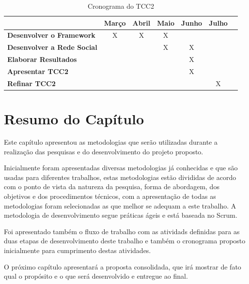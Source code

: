 \begin{table}[h]
\centering
\caption{Cronograma do TCC2}
\label{cronograma tcc2}
\begin{tabular}{|l|c|c|c|c|c|c|}
\hline
                                      			& \multicolumn{1}{l|}{\textbf{Março}} & \multicolumn{1}{l|}{\textbf{Abril}} & \multicolumn{1}{l|}{\textbf{Maio}} & \multicolumn{1}{l|}{\textbf{Junho}} & \multicolumn{1}{l|}{\textbf{Julho}} \\ \hline
\textbf{Desenvolver o Framework}                & X                           		  & X                              		& X                            		 &                               	   &                               		 \\ \hline
\textbf{Desenvolver a Rede Social}              &                            		  &                               		& X                            		 & X                              	   &                               		 \\ \hline
\textbf{Elaborar Resultados}				    &                            		  &                              		&                             		 & X                             	   &                               		 \\ \hline
\textbf{Apresentar TCC2}						&                             		  &                              		&                             		 & X                              	   &                               		 \\ \hline
\textbf{Refinar TCC2}				            &                             		  &                               		&                             		 &                               	   & X                             		 \\ \hline
\end{tabular}
\end{table}

\section{Resumo do Capítulo}

Este capítulo apresentou as metodologias que serão utilizadas durante a realização das pesquisas e do desenvolvimento do projeto proposto.

Inicialmente foram apresentadas diversas metodologias já conhecidas e que são usadas para diferentes trabalhos, estas metodologias estão divididas de acordo com o ponto de vista da natureza da pesquisa, forma de abordagem, dos objetivos e dos procedimentos técnicos, com a apresentação de todas as metodologias foram selecionadas as que melhor se adequam a este trabalho. A metodologia de desenvolvimento segue práticas ágeis e está baseada no Scrum.

Foi apresentado também o fluxo de trabalho com as atividads definidas para as duas etapas de desenvolvimento deste trabalho e também o cronograma proposto inicialmente para cumprimento destas atividades.

O próximo capítulo apresentará a proposta consolidada, que irá mostrar de fato qual o propósito e o que será desenvolvido e entregue ao final.
